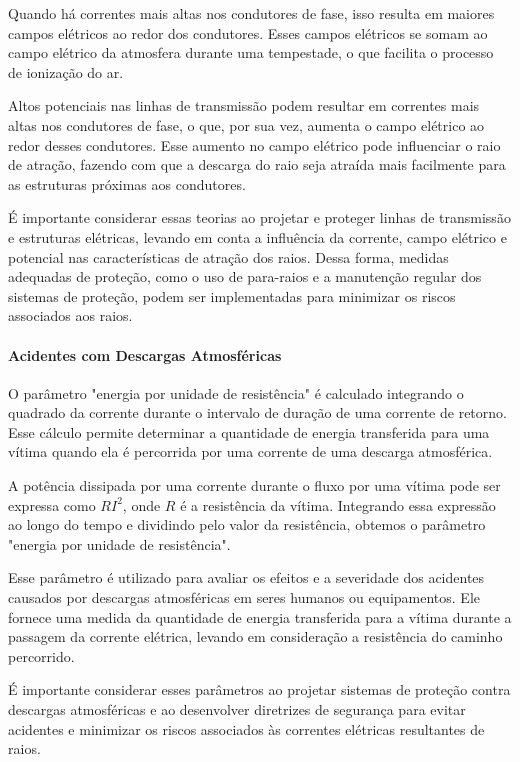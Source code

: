 \documentclass[a4paper, 12pt, onecolumn,singlespacing]{article}
\begin{document}
	Quando há correntes mais altas nos condutores de fase, isso resulta em maiores campos elétricos ao redor dos condutores. Esses campos elétricos se somam ao campo elétrico da atmosfera durante uma tempestade, o que facilita o processo de ionização do ar.
	
	Altos potenciais nas linhas de transmissão podem resultar em correntes mais altas nos condutores de fase, o que, por sua vez, aumenta o campo elétrico ao redor desses condutores. Esse aumento no campo elétrico pode influenciar o raio de atração, fazendo com que a descarga do raio seja atraída mais facilmente para as estruturas próximas aos condutores.
	
	É importante considerar essas teorias ao projetar e proteger linhas de transmissão e estruturas elétricas, levando em conta a influência da corrente, campo elétrico e potencial nas características de atração dos raios. Dessa forma, medidas adequadas de proteção, como o uso de para-raios e a manutenção regular dos sistemas de proteção, podem ser implementadas para minimizar os riscos associados aos raios.
	
	\paragraph{Acidentes com Descargas Atmosféricas}
	
	O parâmetro "energia por unidade de resistência" é calculado integrando o quadrado da corrente durante o intervalo de duração de uma corrente de retorno. Esse cálculo permite determinar a quantidade de energia transferida para uma vítima quando ela é percorrida por uma corrente de uma descarga atmosférica.
	
	A potência dissipada por uma corrente durante o fluxo por uma vítima pode ser expressa como $RI^2$, onde $R$ é a resistência da vítima. Integrando essa expressão ao longo do tempo e dividindo pelo valor da resistência, obtemos o parâmetro "energia por unidade de resistência".
	
	Esse parâmetro é utilizado para avaliar os efeitos e a severidade dos acidentes causados por descargas atmosféricas em seres humanos ou equipamentos. Ele fornece uma medida da quantidade de energia transferida para a vítima durante a passagem da corrente elétrica, levando em consideração a resistência do caminho percorrido.
	
	É importante considerar esses parâmetros ao projetar sistemas de proteção contra descargas atmosféricas e ao desenvolver diretrizes de segurança para evitar acidentes e minimizar os riscos associados às correntes elétricas resultantes de raios.
	
\end{document}
